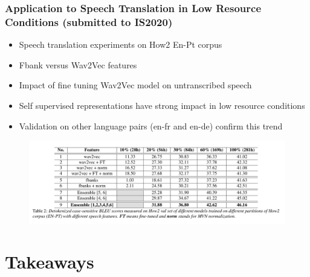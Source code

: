 \documentclass[table]{beamer}
\begin{document}
\begin{frame}
\frametitle{Application to Speech Translation in Low Resource Conditions (submitted to IS2020)}

		\begin{itemize}
			\item Speech translation experiments on How2 En-Pt corpus
			\item Fbank versus Wav2Vec features
			\item Impact of fine tuning Wav2Vec model on untranscribed speech 
			\item Self supervised representations have strong impact in low resource conditions
			\item Validation on other language pairs (en-fr and en-de) confirm this trend
			\end{itemize}

	\begin{figure}
			\centering
			\includegraphics[scale=0.27]	{how2ast} 
			\end{figure}



\end{frame}


\section{Takeaways}
\end{document}

